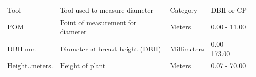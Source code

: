 \documentclass[
  12pt,
]{article}
\begin{document}
\begin{longtable}[]{@{}llll@{}}
\begin{minipage}[t]{0.13\columnwidth}
Tool\strut
\end{minipage} & \begin{minipage}[t]{0.37\columnwidth}\raggedright
Tool used to measure diameter\strut
\end{minipage} & \begin{minipage}[t]{0.19\columnwidth}\raggedright
Category\strut
\end{minipage} & \begin{minipage}[t]{0.20\columnwidth}\raggedright
DBH or CP\strut
\end{minipage}\tabularnewline
\begin{minipage}[t]{0.13\columnwidth}\raggedright
POM\strut
\end{minipage} & \begin{minipage}[t]{0.37\columnwidth}\raggedright
Point of measurement for diameter\strut
\end{minipage} & \begin{minipage}[t]{0.19\columnwidth}\raggedright
Meters\strut
\end{minipage} & \begin{minipage}[t]{0.20\columnwidth}\raggedright
0.00 - 11.00\strut
\end{minipage}\tabularnewline
\begin{minipage}[t]{0.13\columnwidth}\raggedright
DBH.mm\strut
\end{minipage} & \begin{minipage}[t]{0.37\columnwidth}\raggedright
Diameter at breast height (DBH)\strut
\end{minipage} & \begin{minipage}[t]{0.19\columnwidth}\raggedright
Millimeters\strut
\end{minipage} & \begin{minipage}[t]{0.20\columnwidth}\raggedright
0.00 - 173.00\strut
\end{minipage}\tabularnewline
\begin{minipage}[t]{0.13\columnwidth}\raggedright
Height..meters.\strut
\end{minipage} & \begin{minipage}[t]{0.37\columnwidth}\raggedright
Height of plant\strut
\end{minipage} & \begin{minipage}[t]{0.19\columnwidth}\raggedright
Meters\strut
\end{minipage} & \begin{minipage}[t]{0.20\columnwidth}\raggedright
0.07 - 70.00\strut
\end{minipage}\tabularnewline

\end{longtable}
\end{document}
